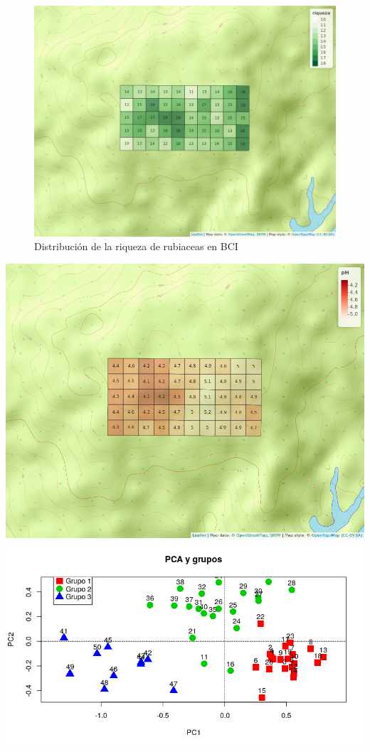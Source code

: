 \documentclass[11pt,]{article}
\begin{document}
\begin{figure}
\centering
\includegraphics{mapa_cuadros_riq_rubic.png}
\caption{Distribución de la riqueza de rubiaceas en BCI
\label{fig:mapa_cuadros_riq}}
\end{figure}

\includegraphics{mapa_cuadros_ph.png}
\includegraphics{grafico_pca_suelo.png}
\end{document}
